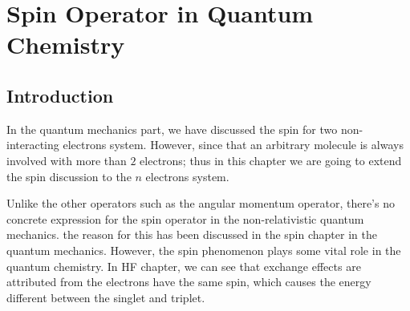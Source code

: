 %
%
%
%
\chapter{Spin Operator in Quantum Chemistry}
%
%
%

\section{Introduction}\label{SIC4}
%
%
In the quantum mechanics part, we have discussed the spin for two
non-interacting electrons system. However, since that an arbitrary
molecule is always involved with more than $2$ electrons; thus in
this chapter we are going to extend the spin discussion to the $n$
electrons system.

Unlike the other operators such as the angular momentum operator,
there's no concrete expression for the spin operator in the
non-relativistic quantum mechanics. the reason for this has been
discussed in the spin chapter in the quantum mechanics. However, the
spin phenomenon plays some vital role in the quantum chemistry. In
HF chapter, we can see that exchange effects are attributed from the
electrons have the same spin, which causes the energy different
between the singlet and triplet.

